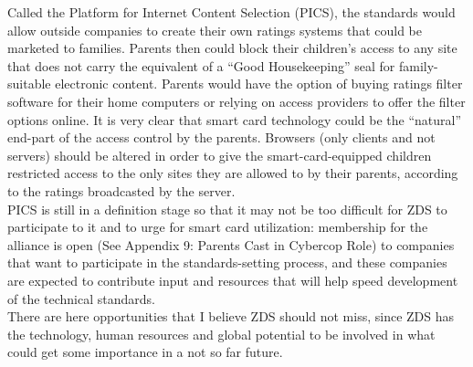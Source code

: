 Called the Platform for Internet Content Selection (PICS), the
standards would allow outside companies to create their own ratings
systems that could be marketed to families. Parents then could block
their children's access to any site that does not carry the equivalent
of a ``Good Housekeeping'' seal for family-suitable electronic content.
Parents would have the option of buying ratings filter software for
their home computers or relying on access providers to offer the filter
options online. It is very clear that smart card technology could be
the ``natural'' end-part of the access control by the parents. Browsers
(only clients and not servers) should be altered in order to give the
smart-card-equipped children restricted access to the only sites they
are allowed to by their parents, according to the ratings broadcasted
by the server.\\

PICS is still in a definition stage so that it may not be too difficult
for ZDS to participate to it and to urge for smart card utilization:
membership for the alliance is open (See Appendix 9: Parents Cast in
Cybercop Role) to companies that want to participate in the
standards-setting process, and these companies are expected to
contribute input and resources that will help speed development of the
technical standards.\\

There are here opportunities that I believe ZDS should not miss, since
ZDS has the technology, human resources and global potential to be
involved in what could get some importance in a not so far future.
